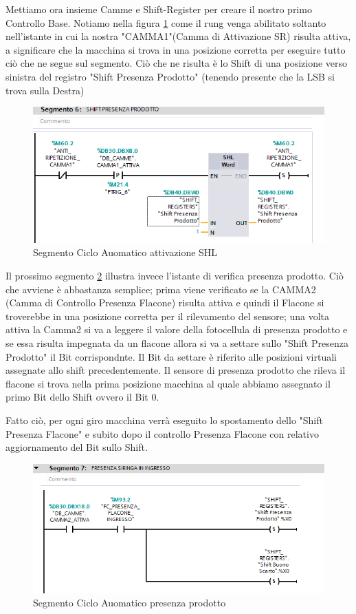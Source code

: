 \documentclass[12pt, a4paper, oneside]{book}
\begin{document}
Mettiamo ora insieme Camme e Shift-Register per creare il nostro primo Controllo Base. Notiamo nella figura \ref{sh3} come il rung venga abilitato soltanto nell'istante in cui la nostra "CAMMA1"(Camma di Attivazione SR) risulta attiva, a significare che la macchina si trova in una posizione corretta per eseguire tutto ciò che ne segue sul segmento. Ciò che ne risulta è lo Shift di una posizione verso sinistra del registro "Shift Presenza Prodotto" (tenendo presente che la LSB si trova sulla Destra)


\begin{figure}[H]
	\centering
	\includegraphics[width=12cm]{Immagini/SH3}
	\caption{ Segmento Ciclo Auomatico attivazione SHL}
	\label{sh3}
\end{figure}

Il prossimo segmento \ref{sh4} illustra invece l'istante di verifica presenza prodotto. Ciò che avviene è abbastanza semplice; prima viene verificato se la CAMMA2 (Camma di Controllo Presenza Flacone) risulta attiva e quindi il Flacone si troverebbe in una posizione corretta per il rilevamento del sensore; una volta attiva la Camma2 si va a leggere il valore della fotocellula di presenza prodotto e se essa risulta impegnata da un flacone allora si va a settare sullo "Shift Presenza Prodotto" il Bit corrispondnte. Il Bit da settare è riferito alle posizioni virtuali assegnate allo shift precedentemente. Il sensore di presenza prodotto che rileva il flacone si trova nella prima posizione macchina al quale abbiamo assegnato il primo Bit dello Shift ovvero il Bit 0. 

Fatto ciò, per ogni giro macchina verrà eseguito lo spostamento dello "Shift  Presenza Flacone" e subito dopo il controllo Presenza Flacone con relativo aggiornamento del Bit sullo Shift.

\begin{figure}[H]
	\centering
	\includegraphics[width=12cm]{Immagini/SH4}
	\caption{ Segmento Ciclo Auomatico presenza prodotto}
	\label{sh4}
\end{figure}
\end{document}

